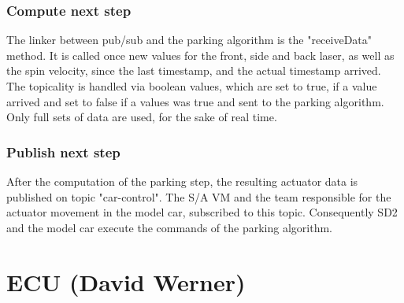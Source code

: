\documentclass[paper=a4, fontsize=11pt]{scrreprt}
\begin{document}
  \subsection{Compute next step}
The linker between pub/sub and the parking algorithm is the "receiveData" method. It is called once new values for the front, side and back laser, as well as the spin velocity, since the last timestamp, and the actual timestamp arrived. The topicality is handled via boolean values, which are set to true, if a value arrived and set to false if a values was true and sent to the parking algorithm. Only full sets of data are used, for the sake of real time.
  \subsection{Publish next step}
After the computation of the parking step, the resulting actuator data is published on topic "car-control". The S/A VM and the team responsible for the actuator movement in the model car, subscribed to this topic. Consequently SD2 and the model car execute the commands of the parking algorithm.
\chapter{ECU (David Werner)}


\end{document}
